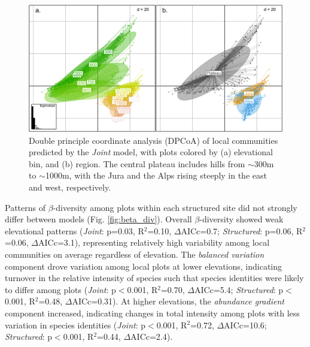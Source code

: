 \documentclass[preprint,review,times,12pt,3p]{elsarticle}
\begin{document}
\begin{figure}
	\centering\includegraphics[width=5in]{ms/1_Ecography/1/figs/DPCoA_Joint.png}
	\caption{\label{fig:dpcoa_joint} Double principle coordinate analysis (DPCoA) of local communities predicted by the \emph{Joint} model, with plots colored by (a) elevational bin, and (b) region. The central plateau includes hills from $\sim$300m to $\sim$1000m, with the Jura and the Alps rising steeply in the east and west, respectively. }
\end{figure}

Patterns of $\beta$-diversity among plots within each structured site did not strongly differ between models (Fig. \ref{fig:beta_div}). Overall $\beta$-diversity showed weak elevational patterns (\emph{Joint}: p=0.03, R$^2$=0.10, $\Delta$AICc=0.7; \emph{Structured}: p=0.06, R$^2$=0.06, $\Delta$AICc=3.1), representing relatively high variability among local communities on average regardless of elevation. The \emph{balanced variation} component drove variation among local plots at lower elevations, indicating turnover in the relative intensity of species such that species identities were likely to differ among plots (\emph{Joint}: p$<$0.001, R$^2$=0.70, $\Delta$AICc=5.4; \emph{Structured}: p$<$0.001, R$^2$=0.48, $\Delta$AICc=0.31). At higher elevations, the \emph{abundance gradient} component increased, indicating changes in total intensity among plots with less variation in species identities (\emph{Joint}: p$<$0.001, R$^2$=0.72, $\Delta$AICc=10.6; \emph{Structured}: p$<$0.001, R$^2$=0.44, $\Delta$AICc=2.4). 
\end{document}

